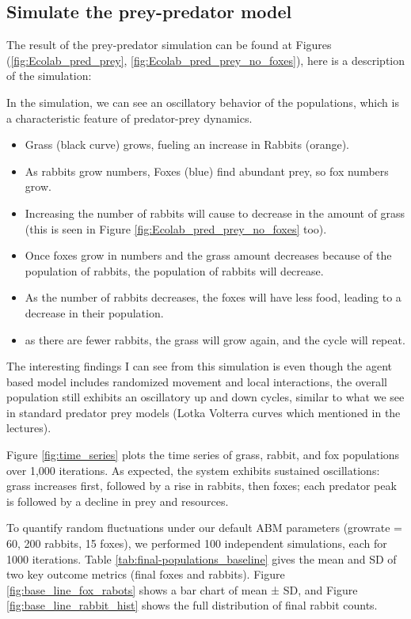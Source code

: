 \subsection{Simulate the prey-predator model}

The result of the prey-predator simulation can be found at Figures (\ref{fig:Ecolab_pred_prey}, \ref{fig:Ecolab_pred_prey_no_foxes}), here is a description of the simulation:

In the simulation, we can see an oscillatory behavior of the populations, which is a characteristic feature of predator-prey dynamics.
\begin{itemize}
    \item Grass (black curve) grows, fueling an increase in Rabbits (orange).
    \item As rabbits grow numbers, Foxes (blue) find abundant prey, so fox numbers grow.
    \item Increasing the number of rabbits will cause to decrease in the amount of grass (this is seen in Figure \ref{fig:Ecolab_pred_prey_no_foxes} too).
    \item Once foxes grow in numbers and the grass amount decreases because of the population of rabbits, the population of rabbits will decrease.
    \item As the number of rabbits decreases, the foxes will have less food, leading to a decrease in their population.
    \item as there are fewer rabbits, the grass will grow again, and the cycle will repeat.
\end{itemize}

The interesting findings I can see from this simulation is even though the agent based model includes randomized movement and local interactions, the overall population still exhibits an oscillatory up and down cycles, similar to what we see in standard predator prey models (Lotka Volterra curves which mentioned in the lectures).

Figure \ref{fig:time_series} plots the time series of grass, rabbit, and fox populations over 1,000 iterations. As expected, the system exhibits sustained oscillations: grass increases first, followed by a rise in rabbits, then foxes; each predator peak is followed by a decline in prey and resources.


To quantify random fluctuations under our default ABM parameters (growrate = 60, 200 rabbits, 15 foxes), we performed 100 independent simulations, each for 1000 iterations. Table \ref{tab:final-populations_baseline} gives the mean and SD of two key outcome metrics (final foxes and rabbits). Figure \ref{fig:base_line_fox_rabots} shows a bar chart of mean ± SD, and Figure \ref{fig:base_line_rabbit_hist} shows the full distribution of final rabbit counts.


